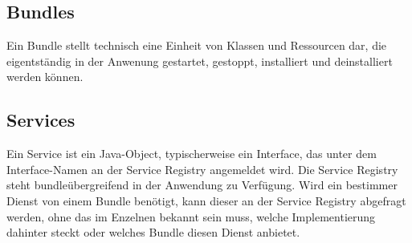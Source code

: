 \subsection{Bundles}
Ein Bundle stellt technisch eine Einheit von Klassen und Ressourcen dar, die
eigentständig in der Anwenung gestartet, gestoppt, installiert und
deinstalliert werden können.
\subsection{Services}
Ein Service ist ein Java-Object, typischerweise ein Interface, das unter dem
Interface-Namen an der Service Registry angemeldet wird.
Die Service Registry steht bundleübergreifend in der Anwendung zu Verfügung.
Wird ein bestimmer Dienst von einem Bundle benötigt, kann dieser an der Service
Registry abgefragt werden, ohne das im Enzelnen bekannt sein muss, welche
Implementierung dahinter steckt oder welches Bundle diesen Dienst anbietet.
\citep{wtherich_die_2008}

